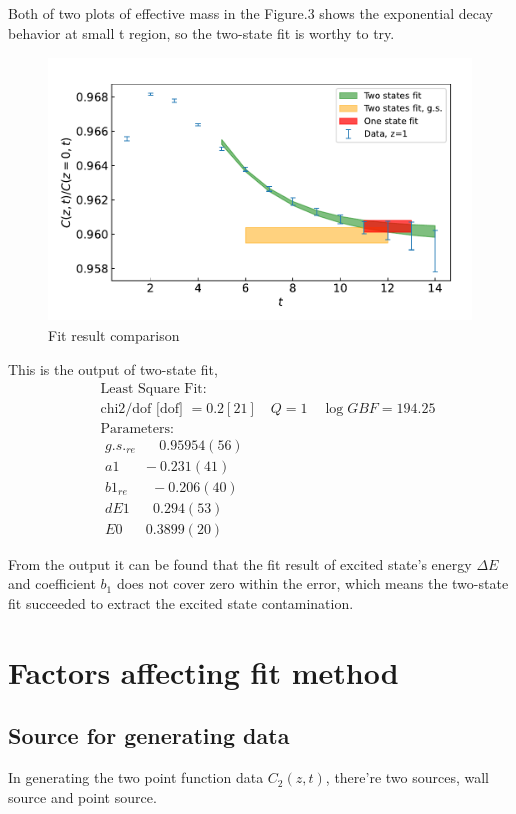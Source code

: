 \documentclass{article}
\begin{document}
Both of two plots of effective mass in the Figure.3 shows the exponential decay behavior at small t region, so the two-state fit is worthy to try.

\begin{figure}
    \centering
    \includegraphics[height=7cm,width=11.3cm]{fit_fig/g_fit_result.pdf}
    \caption{Fit result comparison}
\end{figure}

This is the output of two-state fit,
\begin{equation}
    \begin{aligned}
    &\text { Least Square Fit: } \\
    &\text { chi2/dof [dof] }=0.2[21] \quad Q=1 \quad \log G B F=194.25 \\
    &\text { Parameters: } \\
    &\text { $g.s._{re}$ } \quad 0.95954 (56) \\
    &\text { $a1$ } \quad -0.231 (41) \\
    &\text { $b1_{re}$ } \quad -0.206 (40) \\
    &\text { $dE1$ } \quad 0.294 (53) \\
    &\text { $E0$ } \quad 0.3899 (20)
    \end{aligned}
\end{equation}

From the output it can be found that the fit result of excited state's energy $\Delta E$ and coefficient $b_1$ does not cover zero within the error, which means the two-state fit succeeded to extract the excited state contamination.

\section{Factors affecting fit method}
\subsection{Source for generating data}
In generating the two point function data $C_2(z,t)$, there're two sources, wall source and point source. 
\end{document}
